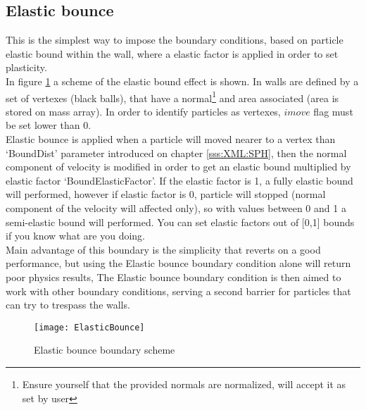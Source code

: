 \subsection{Elastic bounce}
\label{sss:aquagpusph:boundaries:elasticbounce}
%
This is the simplest way to impose the boundary conditions, based on particle elastic bound within the wall, where
a elastic factor is applied in order to set plasticity.\\
%
In figure \ref{fig:aquagpusph:BounceScheme} a scheme of the elastic bound effect is shown. In \NAME walls are
defined by a set of vertexes (black balls), that have a normal\footnote{Ensure yourself that the provided normals
are normalized, \NAME will accept it as set by user} and area associated (area is stored on mass array).
In order to \NAME identify particles as vertexes, $imove$ flag must be set lower than 0.\\
%
Elastic bounce is applied when a particle will moved nearer to a vertex than `BoundDist' parameter introduced on
chapter \ref{sss:XML:SPH}, then the normal component of velocity is modified in order to get an elastic bound
multiplied by elastic factor `BoundElasticFactor'. If the elastic factor is 1, a fully elastic bound will
performed, however if elastic factor is 0, particle will stopped (normal component of the velocity will affected
only), so with values between 0 and 1 a semi-elastic bound will performed. You can set elastic factors out of
[0,1] bounds if you know what are you doing.\\
%
Main advantage of this boundary is the simplicity that reverts on a good performance, but using the Elastic bounce
boundary condition alone will return poor physics results, The Elastic bounce boundary condition is then aimed to
work with other boundary conditions, serving a second barrier for particles that can try to trespass the walls.
%
\begin{figure}[h!]
  \centering
  \texttt{[image: ElasticBounce]}
  \caption{Elastic bounce boundary scheme}
  \label{fig:aquagpusph:BounceScheme}
\end{figure}
%